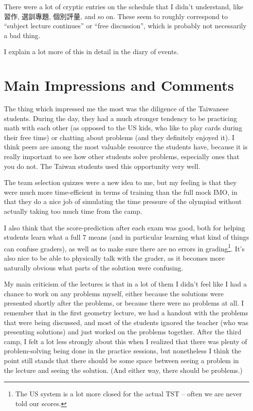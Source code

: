 \documentclass[11pt]{scrreprt}
\begin{document}
There were a lot of cryptic entries on the schedule that I didn't understand, like 習作, 選訓專題, 個別評量, and so on.
These seem to roughly correspond to ``subject lecture continues'' or ``free discussion'',
which is probably not necessarily a bad thing.

I explain a lot more of this in detail in the diary of events.

\section{Main Impressions and Comments}
The thing which impressed me the most was the diligence of the Taiwanese students.
During the day, they had a much stronger tendency to be practicing math with
each other (as opposed to the US kids,
who like to play cards during their free time) or chatting about problems (and they definitely enjoyed it).
I think peers are among the most valuable resource the students have,
because it is really important to see how other students solve problems, especially ones that you do not.
The Taiwan students used this opportunity very well.

The team selection quizzes were a new idea to me,
but my feeling is that they were much more time-efficient in terms of training than the full mock IMO,
in that they do a nice job of simulating the time pressure of the olympiad
without actually taking too much time from the camp.

I also think that the score-prediction after each exam was good,
both for helping students learn what a full $7$ means (and in particular
learning what kind of things can confuse graders),
as well as to make sure there are no errors in grading\footnote{The US system is
a lot more closed for the actual TST -- often we are never told our scores.}.
It's also nice to be able to physically talk with the grader,
as it becomes more naturally obvious what parts of the solution were confusing.

My main criticism of the lectures is that in a lot of them I didn't feel like I
had a chance to work on any problems myself,
either because the solutions were presented shortly after the problems,
or because there were no problems at all.
I remember that in the first geometry lecture, we had a handout with the problems that were being discussed,
and most of the students ignored the teacher (who was presenting solutions) and
just worked on the problems together.
After the third camp, I felt a lot less strongly about this when I realized that
there was plenty of problem-solving being done in the practice sessions,
but nonetheless I think the point still stands that there should be some space
between seeing a problem in the lecture and seeing the solution. (And either way, there should be problems.)
\end{document}
